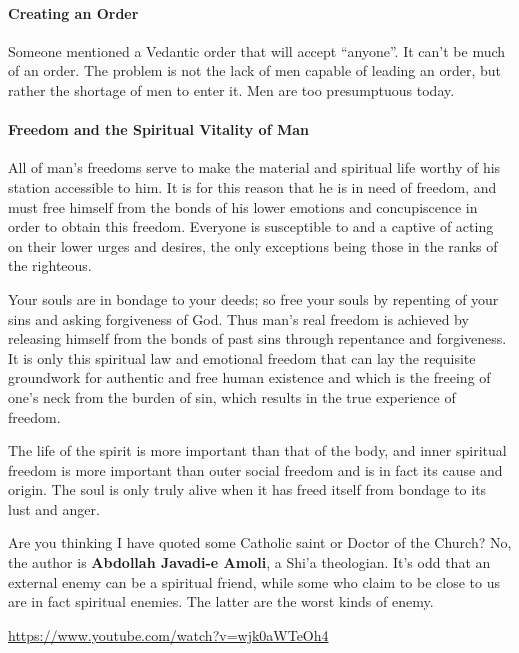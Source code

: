 \paragraph{Creating an Order}


Someone mentioned a Vedantic order that will accept ``anyone''. It can't be much of an order. The problem is not the lack of men capable of leading an order, but rather the shortage of men to enter it. Men are too presumptuous today.

\paragraph{Freedom and the Spiritual Vitality of Man}


\begin{quotex}
All of man's freedoms serve to make the material and spiritual life worthy of his station accessible to him. It is for this reason that he is in need of freedom, and must free himself from the bonds of his lower emotions and concupiscence in order to obtain this freedom. Everyone is susceptible to and a captive of acting on their lower urges and desires, the only exceptions being those in the ranks of the righteous.

Your souls are in bondage to your deeds; so free your souls by repenting of your sins and asking forgiveness of God. Thus man's real freedom is achieved by releasing himself from the bonds of past sins through repentance and forgiveness. It is only this spiritual law and emotional freedom that can lay the requisite groundwork for authentic and free human existence and which is the freeing of one's neck from the burden of sin, which results in the true experience of freedom.

The life of the spirit is more important than that of the body, and inner spiritual freedom is more important than outer social freedom and is in fact its cause and origin. The soul is only truly alive when it has freed itself from bondage to its lust and anger.
\end{quotex}


Are you thinking I have quoted some Catholic saint or Doctor of the Church? No, the author is \textbf{Abdollah Javadi-e Amoli}, a Shi'a theologian. It's odd that an external enemy can be a spiritual friend, while some who claim to be close to us are in fact spiritual enemies. The latter are the worst kinds of enemy.

\url{https://www.youtube.com/watch?v=wjk0aWTeOh4}

